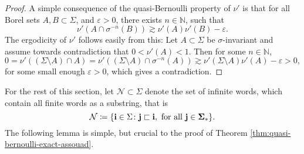 \documentclass{PRM}
\newcommand{\field}[1]{\mathbb{#1}}
\newcommand{\N}{\field{N}}
\theoremstyle{plain}
\theoremstyle{definition}
\theoremstyle{remark}
\begin{document}
\begin{proof}
A simple consequence of the quasi-Bernoulli property of $\nu'$ is that for all Borel sets $A,B\subset \Sigma$, and $\varepsilon>0$, there exists $n\in\N$, such that
\begin{equation*}
    \nu'(A\cap\sigma^{-n}(B))\gtrsim \nu'(A)\nu'(B)-\varepsilon.
\end{equation*}
The ergodicity of $\nu'$ follows easily from this: Let $A\subset \Sigma$ be $\sigma$-invariant and assume towards contradiction that $0<\nu'(A)<1$. Then for some $n\in\N$,
\begin{equation*}
    0=\nu'((\Sigma\setminus A) \cap A)=\nu'((\Sigma\setminus A) \cap \sigma^{-n}(A))\gtrsim\nu'(\Sigma\setminus A)\nu'(A)-\varepsilon>0,
\end{equation*}
for some small enough $\varepsilon>0$, which gives a contradiction.
\end{proof}
For the rest of this section, let $\mathcal{N}\subset \Sigma$ denote the set of infinite words, which contain all finite words as a substring, that is 
\begin{equation*}
    \mathcal{N}\coloneqq \{\mathbf{i}\in\Sigma\colon \mathbf{j}\sqsubset \mathbf{i},\textnormal{ for all }\mathbf{j\in\Sigma_*}\}.
\end{equation*}
The following lemma is simple, but crucial to the proof of Theorem \ref{thm:quasi-bernoulli-exact-assouad}.
\end{document}
